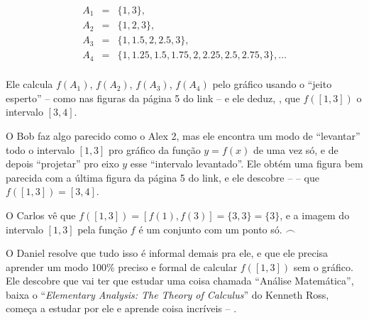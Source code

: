 \documentclass[oneside,12pt]{article}
\begin{document}
{{%
$$\begin{array}{rcl}
  A_1 &=& \{1,3\}, \\
  A_2 &=& \{1,2,3\}, \\
  A_3 &=& \{1,1.5,2,2.5,3\}, \\
  A_4 &=& \{1,1.25,1.5,1.75,2,2.25,2.5,2.75,3\}, \ldots \\
  \end{array}
$$

Ele calcula $f(A_1)$, $f(A_2)$, $f(A_3)$, $f(A_4)$ pelo gráfico usando
o ``jeito esperto'' -- como nas figuras da página 5 do link -- e ele
deduz, , que
$f([1,3])$  o intervalo $[3,4]$.

\msk

O Bob faz algo parecido como o Alex 2, mas ele encontra um modo de
``levantar'' todo o intervalo $[1,3]$ pro gráfico da função $y=f(x)$
de uma vez só, e de depois ``projetar'' pro eixo $y$ esse ``intervalo
levantado''. Ele obtém uma figura bem parecida com a última figura da
página 5 do link, e ele descobre --  -- que $f([1,3]) = [3,4]$.

\msk

O Carlos vê que 
$f([1,3]) = [f(1),f(3)] = \{3,3\} = \{3\}$, e  a
imagem do intervalo $[1,3]$ pela função $f$ é um conjunto com um ponto
só. $\frown$

\msk

O Daniel resolve que tudo isso é informal demais pra ele, e que ele
precisa aprender um modo 100\% preciso e formal de calcular $f([1,3])$
sem o gráfico. Ele descobre que vai ter que estudar uma coisa chamada
``Análise Matemática'', baixa o ``{\sl Elementary Analysis: The Theory
  of Calculus}'' do Kenneth Ross, começa a estudar por ele e aprende
coisa incríveis -- .

\msk


}}


\newpage

\end{document}
